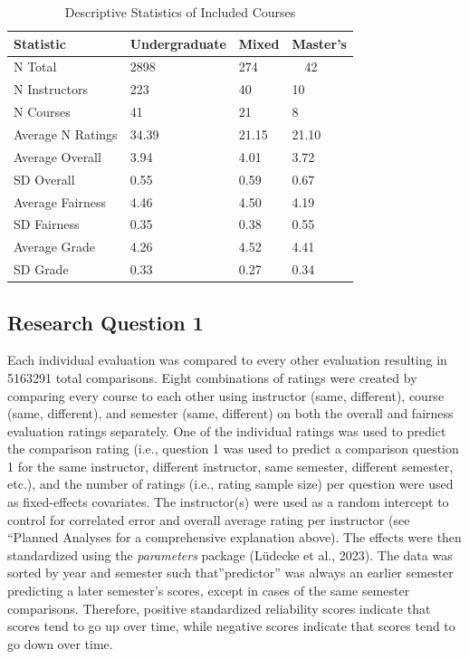 \documentclass[
  man,mask]{apa7}
\begin{document}
\begin{table}[tbp]

\begin{center}
\begin{threeparttable}

\caption{\label{tab:table1}Descriptive Statistics of Included Courses}

\begin{tabular}{llll}
\toprule
Statistic & Undergraduate & Mixed & Master's\\
\midrule
N Total & 2898 & 274 & \ \ 42\\
N Instructors & 223 & 40 & 10\\
N Courses & 41 & 21 & 8\\
Average N Ratings & 34.39 & 21.15 & 21.10\\
Average Overall & 3.94 & 4.01 & 3.72\\
SD Overall & 0.55 & 0.59 & 0.67\\
Average Fairness & 4.46 & 4.50 & 4.19\\
SD Fairness & 0.35 & 0.38 & 0.55\\
Average Grade & 4.26 & 4.52 & 4.41\\
SD Grade & 0.33 & 0.27 & 0.34\\
\bottomrule
\end{tabular}

\end{threeparttable}
\end{center}

\end{table}

\subsection{Research Question 1}\label{research-question-1-1}

Each individual evaluation was compared to every other evaluation
resulting in 5163291 total comparisons. Eight combinations of
ratings were created by comparing every course to each other using
instructor (same, different), course (same, different), and semester
(same, different) on both the overall and fairness evaluation ratings
separately. One of the individual ratings was used to predict the
comparison rating (i.e., question 1 was used to predict a comparison
question 1 for the same instructor, different instructor, same semester,
different semester, etc.), and the number of ratings (i.e., rating
sample size) per question were used as fixed-effects covariates. The
instructor(s) were used as a random intercept to control for correlated
error and overall average rating per instructor (see ``Planned Analyses for a comprehensive explanation above). The effects were then standardized using
the \emph{parameters} package (Lüdecke et al., 2023). The data was sorted by year and
semester such that''predictor'' was always an earlier semester predicting
a later semester's scores, except in cases of the same semester
comparisons. Therefore, positive standardized reliability scores
indicate that scores tend to go up over time, while negative scores
indicate that scores tend to go down over time.
\end{document}
